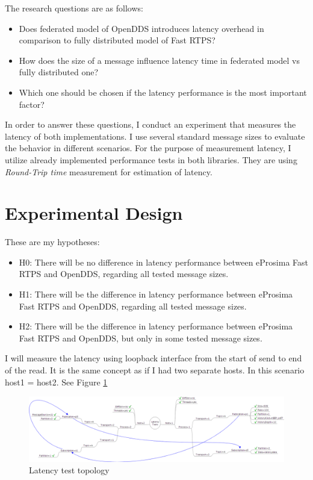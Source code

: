 \documentclass{csfourzero}
\begin{document}
The research questions are as follows:
\begin{itemize}
	\item Does federated model of OpenDDS introduces latency overhead in comparison to fully distributed model of Fast RTPS?
	\item How does the size of a message influence latency time in federated model vs fully distributed one?
	\item Which one should be chosen if the latency performance is the most important factor?
\end{itemize}

In order to answer these questions, I conduct an experiment that measures the latency of both implementations. I use several standard message sizes to evaluate the behavior in different scenarios. For the purpose of measurement latency, I utilize already implemented performance tests in both libraries. They are using \textit{Round-Trip time} measurement for estimation of latency.

\section{Experimental Design}
\label{sec:exp}

\quad These are my hypotheses:
\begin{itemize}
	\item H0: There will be no difference in latency performance between eProsima Fast RTPS and OpenDDS, regarding all tested message sizes.
	\item H1: There will be the difference in latency performance between eProsima Fast RTPS and OpenDDS, regarding all tested message sizes.
	\item H2: There will be the difference in latency performance between eProsima Fast RTPS and OpenDDS, but only in some tested message sizes.
\end{itemize}

I will measure the latency using loopback interface from the start of send to end of the read. It is the same concept as if I had two separate hosts. In this scenario host1 = host2. See Figure \ref{fig:test-topology}

\begin{figure}[!h]
	\centering
	\includegraphics[width=1\textwidth]{openDDS-latency-tests}
	\caption{\label{fig:test-topology}Latency test topology
	\cite{openDDS-test-topology}}
\end{figure}
\end{document}
